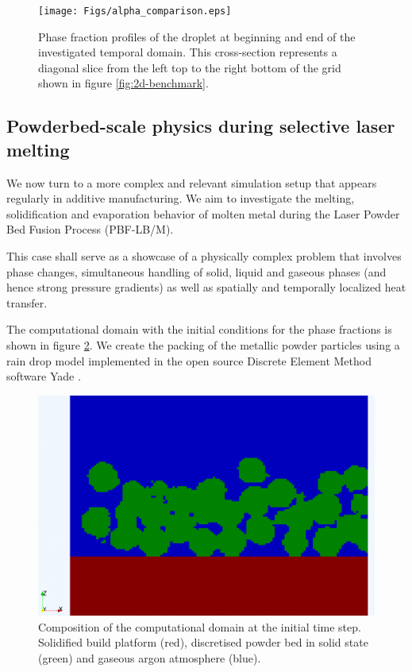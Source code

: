\documentclass[conference,final]{IEEEtran}
\begin{document}
\begin{figure}[!tbp]
  \centering
  \texttt{[image: Figs/alpha\_comparison.eps]}
  \caption{Phase fraction profiles of the droplet at beginning and end of the investigated temporal domain. This cross-section represents a diagonal slice from the left top to the right bottom of the grid shown in figure \ref{fig:2d-benchmark}.}
  \label{fig:alpha-comparison}
\end{figure}

\subsection{Powderbed-scale physics during selective laser melting}\label{sec:lpbf}

We now turn to a more complex and relevant simulation setup that appears regularly in additive manufacturing. We aim to investigate the melting, solidification and evaporation behavior of molten metal during the Laser Powder Bed Fusion Process (PBF-LB/M).

This case shall serve as a showcase of a physically complex problem that involves phase changes, simultaneous handling of solid, liquid and gaseous phases (and hence strong pressure gradients) as well as spatially and temporally localized heat transfer.

The computational domain with the initial conditions for the phase fractions is shown in figure \ref{fig:lpbf-initial}. We create the packing of the metallic powder particles using a rain drop model implemented in the open source Discrete Element Method software Yade \cite{vaclavsmilauerYadeDocumentation2021}.

\begin{figure}[!tbp]
  \centering
  \includegraphics[width=\linewidth]{Figs/powderbed.png}
  \caption{Composition of the computational domain at the initial time step. Solidified build platform (red), discretised powder bed in solid state (green) and gaseous argon atmosphere (blue).}
  \label{fig:lpbf-initial}
\end{figure}
\end{document}
